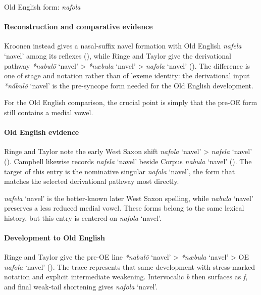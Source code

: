 \documentclass[
  british,
  a4paper,
]{article}
\providecommand{\Recon}[1]{\emph{*#1}}
\begin{document}
Old English form: \emph{nafola}

\paragraph{Reconstruction and comparative
evidence}\label{reconstruction-and-comparative-evidence-97}

Kroonen instead gives a nasal-suffix navel formation with Old English
{\emph{nafela}} `navel' among its reflexes
(), while Ringe and Taylor
give the derivational pathway \Recon{nabulō} `navel' \textgreater{}
\Recon{næbula} `navel' \textgreater{} \emph{nafola} `navel'
(). The
difference is one of stage and notation rather than of lexeme identity:
the derivational input \Recon{nábulô} `navel' is the pre-syncope form
needed for the Old English development.

For the Old English comparison, the crucial point is simply that the
pre-OE form still contains a medial vowel.

\paragraph{Old English evidence}\label{old-english-evidence-97}

Ringe and Taylor note the early West Saxon shift {\emph{nafola}} `navel'
\textgreater{} {\emph{nafela}} `navel'
(). Campbell
likewise records \emph{nafela} `navel' beside Corpus {\emph{nabula}}
`navel' (). The
target of this entry is the nominative singular {\emph{nafola}} `navel',
the form that matches the selected derivational pathway most directly.

{\emph{nafela}} `navel' is the better-known later West Saxon spelling,
while {\emph{nabula}} `navel' preserves a less reduced medial vowel.
These forms belong to the same lexical history, but this entry is
centered on {\emph{nafola}} `navel'.

\paragraph{Development to Old
English}\label{development-to-old-english-97}

Ringe and Taylor give the pre-OE line \Recon{nabulō} `navel'
\textgreater{} \Recon{næbula} `navel' \textgreater{} OE \emph{nafola}
`navel' ().
The trace represents that same development with stress-marked notation
and explicit intermediate weakening. Intervocalic \emph{b} then surfaces
as \emph{f}, and final weak-tail shortening gives \emph{nafola} `navel'.
\end{document}
